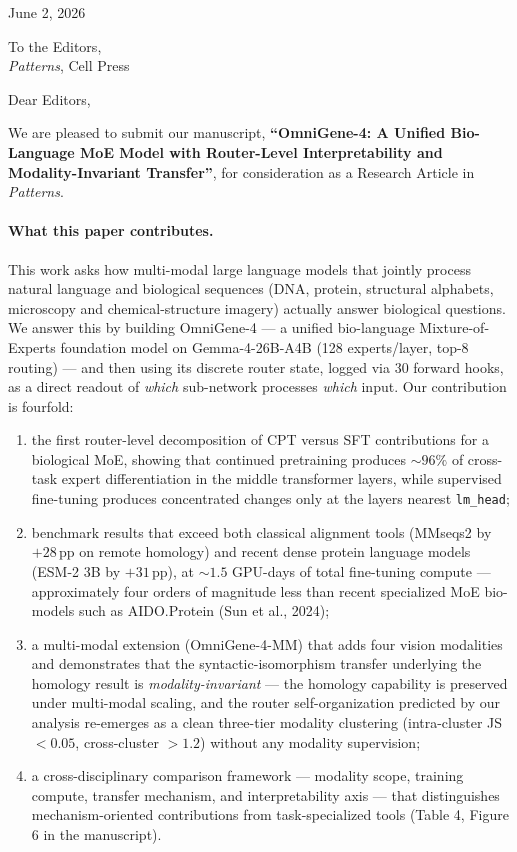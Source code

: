 \documentclass[11pt]{article}
\begin{document}
\hfill June 2, 2026

\medskip

To the Editors,\\
\textit{Patterns}, Cell Press

\medskip

Dear Editors,

We are pleased to submit our manuscript, \textbf{``OmniGene-4: A Unified Bio-Language MoE Model with Router-Level Interpretability and Modality-Invariant Transfer''}, for consideration as a Research Article in \textit{Patterns}.

\paragraph{What this paper contributes.}
This work asks how multi-modal large language models that jointly process natural language and biological sequences (DNA, protein, structural alphabets, microscopy and chemical-structure imagery) actually answer biological questions. We answer this by building OmniGene-4 --- a unified bio-language Mixture-of-Experts foundation model on Gemma-4-26B-A4B (128 experts/layer, top-8 routing) --- and then using its discrete router state, logged via $30$ forward hooks, as a direct readout of \emph{which} sub-network processes \emph{which} input. Our contribution is fourfold:
\begin{enumerate}
    \item the first router-level decomposition of CPT versus SFT contributions for a biological MoE, showing that continued pretraining produces $\sim 96\%$ of cross-task expert differentiation in the middle transformer layers, while supervised fine-tuning produces concentrated changes only at the layers nearest \texttt{lm\_head};
    \item benchmark results that exceed both classical alignment tools (MMseqs2 by $+28$\,pp on remote homology) and recent dense protein language models (ESM-2 3B by $+31$\,pp), at $\sim 1.5$ GPU-days of total fine-tuning compute --- approximately four orders of magnitude less than recent specialized MoE bio-models such as AIDO.Protein (Sun et al., 2024);
    \item a multi-modal extension (OmniGene-4-MM) that adds four vision modalities and demonstrates that the syntactic-isomorphism transfer underlying the homology result is \emph{modality-invariant} --- the homology capability is preserved under multi-modal scaling, and the router self-organization predicted by our analysis re-emerges as a clean three-tier modality clustering (intra-cluster JS $<0.05$, cross-cluster $>1.2$) without any modality supervision;
    \item a cross-disciplinary comparison framework --- modality scope, training compute, transfer mechanism, and interpretability axis --- that distinguishes mechanism-oriented contributions from task-specialized tools (Table 4, Figure 6 in the manuscript).
\end{enumerate}
\end{document}
